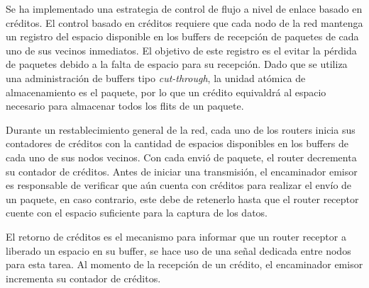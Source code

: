 Se ha implementado una estrategia de control de flujo a nivel de enlace basado en créditos. El control basado en créditos requiere que cada nodo de la red mantenga un registro del espacio disponible en los buffers de recepción de paquetes de cada uno de sus vecinos inmediatos. El objetivo de este registro es el evitar la pérdida de paquetes debido a la falta de espacio para su recepción. Dado que se utiliza una administración de buffers tipo \textit{cut-through}, la unidad atómica de almacenamiento es el paquete, por lo que un crédito equivaldrá al espacio necesario para almacenar todos los flits de un paquete.

Durante un restablecimiento general de la red, cada uno de los routers inicia sus contadores de créditos con la cantidad de espacios disponibles en los buffers de cada uno de sus nodos vecinos. Con cada envió de paquete, el router decrementa su contador de créditos. Antes de iniciar una transmisión, el encaminador emisor es responsable de verificar que aún cuenta con créditos para realizar el envío de un paquete, en caso contrario, este debe de retenerlo hasta que el router receptor cuente con el espacio suficiente para la captura de los datos.

El retorno de créditos es el mecanismo para informar que un router receptor a liberado un espacio en su buffer, se hace uso de una señal dedicada entre nodos para esta tarea. Al momento de la recepción de un crédito, el encaminador emisor incrementa su contador de créditos. 

